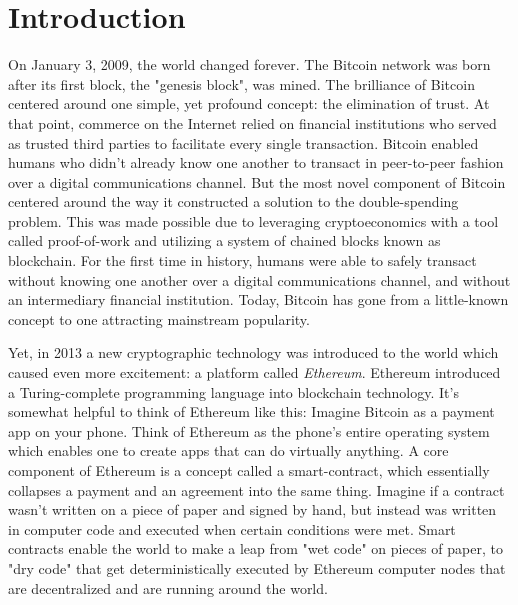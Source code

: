 \documentclass{article}
\begin{document}
\clearpage

\section{Introduction}
On January 3, 2009, the world changed forever. The Bitcoin network was born after its first block, the "genesis block", was mined. The brilliance of Bitcoin centered around one simple, yet profound concept: the elimination of trust. At that point, commerce on the Internet relied on financial institutions who served as trusted third parties to facilitate every single transaction. Bitcoin enabled humans who didn't already know one another to transact in peer-to-peer fashion over a digital communications channel. But the most novel component of Bitcoin centered around the way it constructed a solution to the double-spending problem. This was made possible due to leveraging \gls{cryptoeconomics} with a tool called \gls{proof-of-work} and utilizing a system of chained blocks known as blockchain. For the first time in history, humans were able to safely transact without knowing one another over a digital communications channel, and without an intermediary financial institution. Today, Bitcoin has gone from a little-known concept to one attracting mainstream popularity.

Yet, in 2013 a new cryptographic technology was introduced to the world which caused even more excitement: a platform called \textit{Ethereum}. Ethereum introduced a Turing-complete programming language into blockchain technology. It's somewhat helpful to think of Ethereum like this: Imagine Bitcoin as a payment app on your phone. Think of Ethereum as the phone's entire operating system which enables one to create apps that can do virtually anything.
A core component of Ethereum is a concept called a \gls{smart-contract}, which essentially collapses a payment and an agreement into the same thing. Imagine if a contract wasn't written on a piece of paper and signed by hand, but instead was written in computer code and executed when certain conditions were met. Smart contracts enable the world to make a leap from "wet code" on pieces of paper, to "dry code" that get deterministically executed by Ethereum computer nodes that are decentralized and are running around the world.
\end{document}
